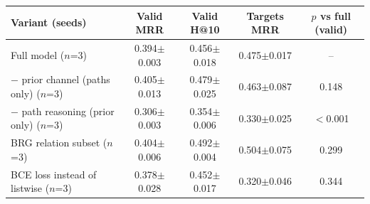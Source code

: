 \begin{tabular}{lcccc}
\toprule
Variant (seeds) & Valid MRR & Valid H@10 & Targets MRR & $p$ vs full (valid)\\
\midrule
Full model ($n$=3) & 0.394$\pm$0.003 & 0.456$\pm$0.018 & 0.475$\pm$0.017 & --\\
$-$ prior channel (paths only) ($n$=3) & 0.405$\pm$0.013 & 0.479$\pm$0.025 & 0.463$\pm$0.087 & 0.148\\
$-$ path reasoning (prior only) ($n$=3) & 0.306$\pm$0.003 & 0.354$\pm$0.006 & 0.330$\pm$0.025 & $<$0.001\\
BRG relation subset ($n$=3) & 0.404$\pm$0.006 & 0.492$\pm$0.004 & 0.504$\pm$0.075 & 0.299\\
BCE loss instead of listwise ($n$=3) & 0.378$\pm$0.028 & 0.452$\pm$0.017 & 0.320$\pm$0.046 & 0.344\\
\bottomrule
\end{tabular}